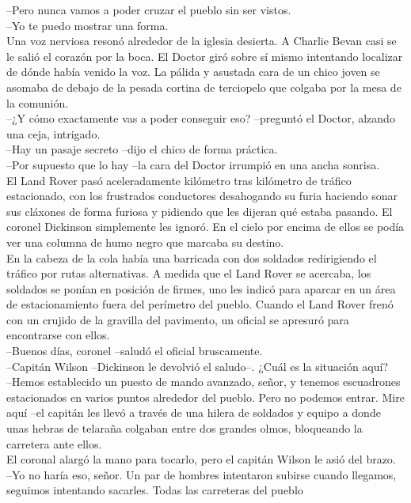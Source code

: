 --Pero nunca vamos a poder cruzar el pueblo sin ser vistos.\\
--Yo te puedo mostrar una forma.\\
Una voz nerviosa resonó alrededor de la iglesia desierta. A Charlie
Bevan casi se le salió el corazón por la boca. El Doctor giró sobre sí
mismo intentando localizar de dónde había venido la voz. La pálida y
asustada cara de un chico joven se asomaba de debajo de la pesada
cortina de terciopelo que colgaba por la mesa de la comunión.\\
--¿Y cómo exactamente vas a poder conseguir eso? --preguntó el Doctor,
alzando una ceja, intrigado.\\
--Hay un pasaje secreto --dijo el chico de forma práctica.\\
--Por supuesto que lo hay --la cara del Doctor irrumpió en una ancha
sonrisa.\\[2\baselineskip]El Land Rover pasó aceleradamente kilómetro
tras kilómetro de tráfico estacionado, con los frustrados conductores
desahogando su furia haciendo sonar sus cláxones de forma furiosa y
pidiendo que les dijeran qué estaba pasando. El coronel Dickinson
simplemente les ignoró. En el cielo por encima de ellos se podía ver una
columna de humo negro que marcaba su destino.\\
En la cabeza de la cola había una barricada con dos soldados
redirigiendo el tráfico por rutas alternativas. A medida que el Land
Rover se acercaba, los soldados se ponían en posición de firmes, uno les
indicó para aparcar en un área de estacionamiento fuera del perímetro
del pueblo. Cuando el Land Rover frenó con un crujido de la gravilla del
pavimento, un oficial se apresuró para encontrarse con ellos.\\
--Buenos días, coronel --saludó el oficial bruscamente.\\
--Capitán Wilson --Dickinson le devolvió el saludo--. ¿Cuál es la
situación aquí?\\
--Hemos establecido un puesto de mando avanzado, señor, y tenemos
escuadrones estacionados en varios puntos alrededor del pueblo. Pero no
podemos entrar. Mire aquí --el capitán les llevó a través de una hilera
de soldados y equipo a donde unas hebras de telaraña colgaban entre dos
grandes olmos, bloqueando la carretera ante ellos.\\
El coronal alargó la mano para tocarlo, pero el capitán Wilson le asió
del brazo.\\
--Yo no haría eso, señor. Un par de hombres intentaron subirse cuando
llegamos, seguimos intentando sacarles. Todas las carreteras del pueblo
